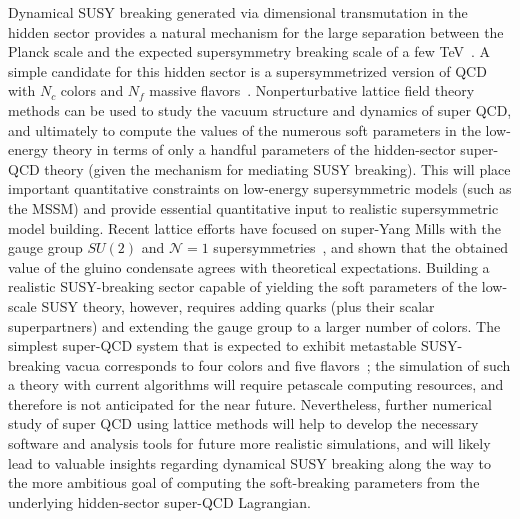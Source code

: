 \begin{itemize}
Dynamical SUSY breaking generated via dimensional transmutation in the hidden
sector provides a natural mechanism for the large separation between the
Planck scale and the expected supersymmetry breaking scale of a few
TeV~\cite{Witten:1981nf}.  A simple candidate for this hidden sector is a
supersymmetrized version of QCD with $N_c$ colors and $N_f$ massive
flavors~\cite{Intriligator:2006dd}.  Nonperturbative lattice field theory
methods can be used to study the vacuum structure and dynamics of super QCD,
and ultimately to compute the values of the numerous soft parameters in the
low-energy theory in terms of only a handful parameters of the hidden-sector
super-QCD theory (given the mechanism for mediating SUSY breaking).  This will
place important quantitative constraints on low-energy supersymmetric models
(such as the MSSM) and provide essential quantitative input to realistic
supersymmetric model building.
Recent lattice efforts have focused on super-Yang Mills with the gauge group
$SU(2)$ and ${\mathcal N}=1$
supersymmetries~\cite{Giedt:2008xm,Endres:2009yp,Demmouche:2010sf}, and shown
that the obtained value of the gluino condensate agrees with theoretical
expectations.  Building a realistic SUSY-breaking sector capable of yielding
the soft parameters of the low-scale SUSY theory, however, requires adding
quarks (plus their scalar superpartners) and extending the gauge group to a
larger number of colors.  The simplest super-QCD system that is expected to
exhibit metastable SUSY-breaking vacua corresponds to four colors and five
flavors~\cite{Intriligator:2006dd}; the simulation of such a theory with
current algorithms will require petascale computing resources, and therefore
is not anticipated for the near future.  Nevertheless, further numerical study
of super QCD using lattice methods will help to develop the necessary software
and analysis tools for future more realistic simulations, and will likely lead
to valuable insights regarding dynamical SUSY breaking along the way to the
more ambitious goal of computing the soft-breaking parameters from the
underlying hidden-sector super-QCD Lagrangian.

\end{itemize}

